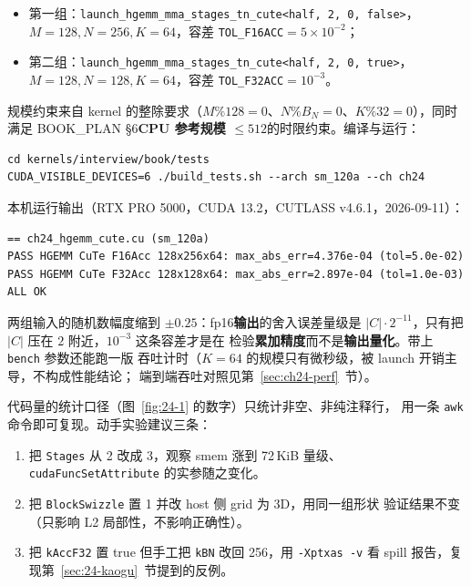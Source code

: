 \begin{itemize}
  \item 第一组：\texttt{launch\_\allowbreak{}hgemm\_\allowbreak{}mma\_\allowbreak{}stages\_\allowbreak{}tn\_\allowbreak{}cute\allowbreak{}<half, 2, 0, false>}，
        $M{=}128,N{=}256,K{=}64$，容差 \texttt{TOL\_F16ACC}$=5\times10^{-2}$；
  \item 第二组：\texttt{launch\_\allowbreak{}hgemm\_\allowbreak{}mma\_\allowbreak{}stages\_\allowbreak{}tn\_\allowbreak{}cute\allowbreak{}<half, 2, 0, true>}，
        $M{=}128,N{=}128,K{=}64$，容差 \texttt{TOL\_F32ACC}$=10^{-3}$。
\end{itemize}

规模约束来自 kernel 的整除要求（$M\%128=0$、$N\%B_N=0$、$K\%32=0$），同时满足
BOOK\_PLAN §6\textbf{CPU 参考规模 $\le 512$}的时限约束。编译与运行：

\begin{lstlisting}[style=console]
cd kernels/interview/book/tests
CUDA_VISIBLE_DEVICES=6 ./build_tests.sh --arch sm_120a --ch ch24
\end{lstlisting}

本机运行输出（RTX PRO 5000，CUDA 13.2，CUTLASS v4.6.1，2026-09-11）：

\begin{lstlisting}[style=console]
== ch24_hgemm_cute.cu (sm_120a)
PASS HGEMM CuTe F16Acc 128x256x64: max_abs_err=4.376e-04 (tol=5.0e-02)
PASS HGEMM CuTe F32Acc 128x128x64: max_abs_err=2.897e-04 (tol=1.0e-03)
ALL OK
\end{lstlisting}

两组输入的随机数幅度缩到 $\pm0.25$：fp16\textbf{输出}的舍入误差量级是
$|C|\cdot2^{-11}$，只有把 $|C|$ 压在 $2$ 附近，$10^{-3}$ 这条容差才是在
检验\textbf{累加精度}而不是\textbf{输出量化}。带上 \texttt{bench} 参数还能跑一版
吞吐计时（$K{=}64$ 的规模只有微秒级，被 launch 开销主导，不构成性能结论；
端到端吞吐对照见第~\ref{sec:ch24-perf}~节）。

代码量的统计口径（图~\ref{fig:24-1} 的数字）只统计非空、非纯注释行，
用一条 \texttt{awk} 命令即可复现。动手实验建议三条：

\begin{enumerate}
  \item 把 \texttt{Stages} 从 2 改成 3，观察 smem 涨到 72\,KiB 量级、
        \texttt{cuda\allowbreak{}Func\allowbreak{}Set\allowbreak{}Attribute} 的实参随之变化。
  \item 把 \texttt{Block\allowbreak{}Swizzle} 置 1 并改 host 侧 grid 为 3D，用同一组形状
        验证结果不变（只影响 L2 局部性，不影响正确性）。
  \item 把 \texttt{kAccF32} 置 true 但手工把 \texttt{kBN} 改回 256，用
        \texttt{-Xptxas -v} 看 spill 报告，复现第~\ref{sec:24-kaogu}~节提到的反例。
\end{enumerate}

